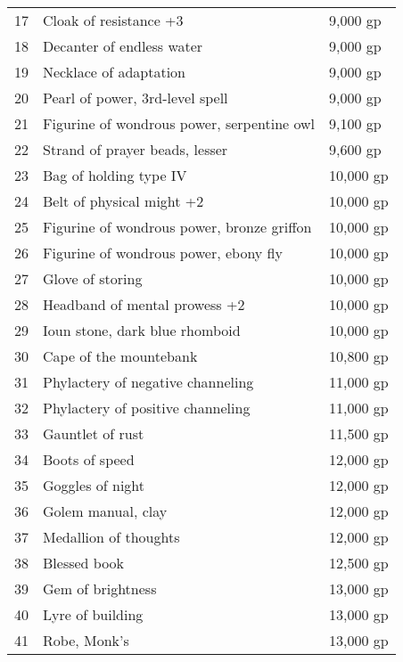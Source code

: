 \begin{xtabular}{lll}
17  & Cloak of resistance +3                      & 9,000 gp     \\
18  & Decanter of endless water                   & 9,000 gp     \\
19  & Necklace of adaptation                      & 9,000 gp     \\
20  & Pearl of power, 3rd-level spell             & 9,000 gp     \\
21  & Figurine of wondrous power, serpentine owl  & 9,100 gp     \\
22  & Strand of prayer beads, lesser              & 9,600 gp     \\
23  & Bag of holding type IV                      & 10,000 gp    \\
24  & Belt of physical might +2                   & 10,000 gp    \\
25  & Figurine of wondrous power, bronze griffon  & 10,000 gp    \\
26  & Figurine of wondrous power, ebony fly       & 10,000 gp    \\
27  & Glove of storing                            & 10,000 gp    \\
28  & Headband of mental prowess +2               & 10,000 gp    \\
29  & Ioun stone, dark blue rhomboid              & 10,000 gp    \\
30  & Cape of the mountebank                      & 10,800 gp    \\
31  & Phylactery of negative channeling           & 11,000 gp    \\
32  & Phylactery of positive channeling           & 11,000 gp    \\
33  & Gauntlet of rust                            & 11,500 gp    \\
34  & Boots of speed                              & 12,000 gp    \\
35  & Goggles of night                            & 12,000 gp    \\
36  & Golem manual, clay                          & 12,000 gp    \\
37  & Medallion of thoughts                       & 12,000 gp    \\
38  & Blessed book                                & 12,500 gp    \\
39  & Gem of brightness                           & 13,000 gp    \\
40  & Lyre of building                            & 13,000 gp    \\
41  & Robe, Monk's                                & 13,000 gp    \\

\end{xtabular}
